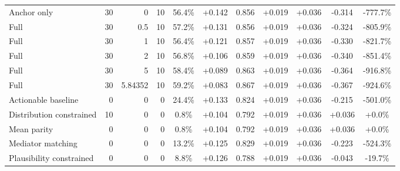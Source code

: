 \begin{table}[htbp]
\begin{tabular}{lrrrccccccc}
Anchor only & 30 & 0 & 10 & 56.4\% & +0.142 & 0.856 & +0.019 & +0.036 & -0.314 & -777.7\% \\
Full & 30 & 0.5 & 10 & 57.2\% & +0.131 & 0.856 & +0.019 & +0.036 & -0.324 & -805.9\% \\
Full & 30 & 1 & 10 & 56.4\% & +0.121 & 0.857 & +0.019 & +0.036 & -0.330 & -821.7\% \\
Full & 30 & 2 & 10 & 56.8\% & +0.106 & 0.859 & +0.019 & +0.036 & -0.340 & -851.4\% \\
Full & 30 & 5 & 10 & 58.4\% & +0.089 & 0.863 & +0.019 & +0.036 & -0.364 & -916.8\% \\
Full & 30 & 5.84352 & 10 & 59.2\% & +0.083 & 0.867 & +0.019 & +0.036 & -0.367 & -924.6\% \\
Actionable baseline & 0 & 0 & 0 & 24.4\% & +0.133 & 0.824 & +0.019 & +0.036 & -0.215 & -501.0\% \\
Distribution constrained & 10 & 0 & 0 & 0.8\% & +0.104 & 0.792 & +0.019 & +0.036 & +0.036 & +0.0\% \\
Mean parity & 0 & 0 & 0 & 0.8\% & +0.104 & 0.792 & +0.019 & +0.036 & +0.036 & +0.0\% \\
Mediator matching & 0 & 0 & 0 & 13.2\% & +0.125 & 0.829 & +0.019 & +0.036 & -0.223 & -524.3\% \\
Plausibility constrained & 0 & 0 & 0 & 8.8\% & +0.126 & 0.788 & +0.019 & +0.036 & -0.043 & -19.7\% \\
\bottomrule
\end{tabular}
\end{table}